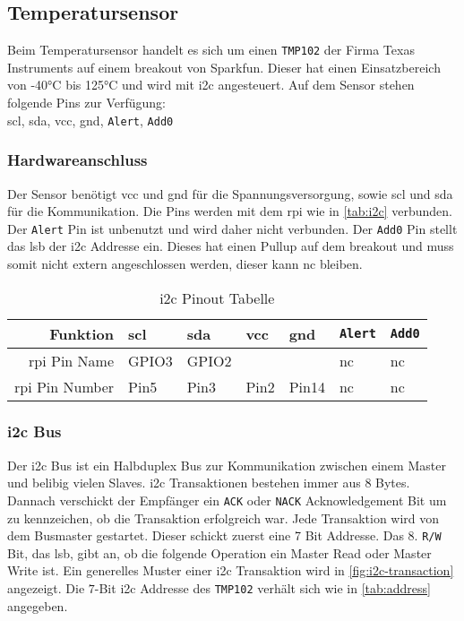 \subsection{Temperatursensor}

Beim Temperatursensor handelt es sich um einen \texttt{TMP102} der Firma Texas Instruments auf einem \gls{breakout} von Sparkfun.
Dieser hat einen Einsatzbereich von -40\si{\celsius} bis 125\si{\celsius} und wird mit \gls{i2c} angesteuert.
Auf dem Sensor stehen folgende Pins zur Verfügung: \\
\gls{scl}, \gls{sda}, \gls{vcc}, \gls{gnd}, \texttt{Alert}, \texttt{Add0}

\subsubsection{Hardwareanschluss}

Der Sensor benötigt \gls{vcc} und \gls{gnd} für die Spannungsversorgung, sowie \gls{scl} und \gls{sda} für die Kommunikation.
Die Pins werden mit dem \gls{rpi} wie in \autoref{tab:i2c} verbunden.
Der \texttt{Alert} Pin ist unbenutzt und wird daher nicht verbunden.
Der \texttt{Add0} Pin stellt das \gls{lsb} der \gls{i2c} Addresse ein.
Dieses hat einen Pullup auf dem \gls{breakout} und muss somit nicht extern angeschlossen werden, dieser kann \gls{nc} bleiben.

\begin{table}[h]
    \centering
    \begin{tabular}{|r||l|l|l|l|l|l|}
        \hline
        \textbf{Funktion} & \textbf{\gls{scl}} & \textbf{\gls{sda}} & \textbf{\gls{vcc}} & \textbf{\gls{gnd}} & \textbf{\texttt{Alert}} & \textbf{\texttt{Add0}}\\
        \hline
        \hline
        \gls{rpi} Pin Name & GPIO3 & GPIO2 & & & \gls{nc} & \gls{nc} \\
        \hline
        \gls{rpi} Pin Number & Pin5 & Pin3 & Pin2 & Pin14 & \gls{nc} & \gls{nc} \\
        \hline
    \end{tabular}
    \caption{\gls{i2c} Pinout Tabelle}
    \label{tab:i2c}
\end{table}

\subsubsection{\acrshort{i2c} Bus}

Der \gls{i2c} Bus ist ein Halbduplex Bus zur Kommunikation zwischen einem Master und belibig vielen Slaves.
\gls{i2c} Transaktionen bestehen immer aus 8 Bytes.
Dannach verschickt der Empfänger ein \texttt{ACK} oder \texttt{NACK} Acknowledgement Bit um zu kennzeichen, ob die Transaktion erfolgreich war.
Jede Transaktion wird von dem Busmaster gestartet.
Dieser schickt zuerst eine 7 Bit Addresse. Das 8. \texttt{R/W} Bit, das \gls{lsb}, gibt an, ob die folgende Operation ein Master Read oder Master Write ist.
Ein generelles Muster einer \gls{i2c} Transaktion wird in \autoref{fig:i2c-transaction} angezeigt.
Die $7$-Bit \gls{i2c} Addresse des \texttt{TMP102} verhält sich wie in \autoref{tab:address} angegeben.


